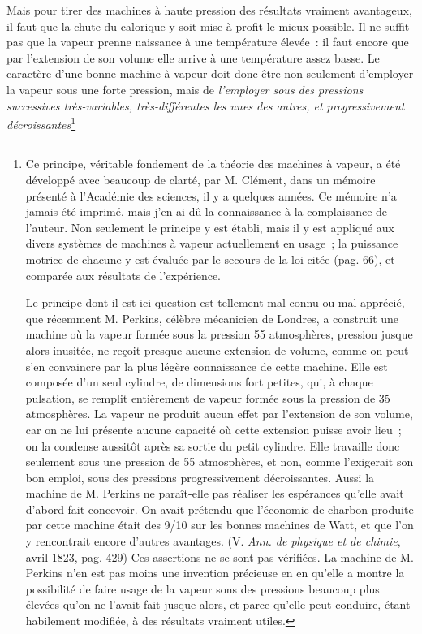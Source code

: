 \documentclass[french,twoside]{book} %
\begin{document}
Mais pour tirer des machines à haute pression des résultats vraiment avantageux, il faut que la chute du calorique y soit mise à profit le mieux possible. Il ne suffit pas que la vapeur prenne naissance à une température élevée : il faut encore que par l’extension de son volume elle arrive à une température assez basse. Le caractère d’une bonne machine à vapeur doit donc être non seulement d’employer la vapeur sous une forte pression, mais de \emph{l’employer sous des pressions successives très-variables, très-différentes les unes des autres, et progressivement décroissantes}\footnote{ \noindent Ce principe, véritable fondement de la théorie des machines à vapeur, a été développé avec beaucoup de clarté, par M. Clément, dans un mémoire présenté à l’Académie des sciences, il y a quelques années. Ce mémoire n’a jamais été imprimé, mais j’en ai dû la connaissance à la complaisance de l’auteur. Non seulement le principe y est établi, mais il y est appliqué aux divers systèmes de machines à vapeur actuellement en usage ; la puissance motrice de chacune y est évaluée par le secours de la loi citée (pag. 66), et comparée aux résultats de l’expérience.\par
 Le principe dont il est ici question est tellement mal connu ou mal apprécié, que récemment M. Perkins, célèbre mécanicien de Londres, a construit une machine où la vapeur formée sous la pression 55 atmosphères, pression jusque alors inusitée, ne reçoit presque aucune extension de volume, comme on peut s’en convaincre par la plus légère connaissance de cette machine. Elle est composée d’un seul cylindre, de dimensions fort petites, qui, à chaque pulsation, se remplit entièrement de vapeur formée sous la pression de 35 atmosphères. La vapeur ne produit aucun effet par l’extension de son volume, car on ne lui présente aucune capacité où cette extension puisse avoir lieu ; on la condense aussitôt après sa sortie du petit cylindre. Elle travaille donc seulement sous une pression de 55 atmosphères, et non, comme l’exigerait son bon emploi, sous des pressions progressivement décroissantes. Aussi la machine de M. Perkins ne paraît-elle pas réaliser les espérances qu’elle avait d’abord fait concevoir. On avait prétendu que l’économie de charbon produite par cette machine était des 9/10 sur les bonnes machines de Watt, et que l’on y rencontrait encore d’autres avantages. (V. \emph{Ann. de physique et de chimie}, avril 1823, pag. 429) Ces assertions ne se sont pas vérifiées. La machine de M. Perkins n’en est pas moins une invention précieuse en en qu’elle a montre la possibilité de faire usage de la vapeur sons des pressions beaucoup plus élevées qu’on ne l’avait fait jusque alors, et parce qu’elle peut conduire, étant habilement modifiée, à des résultats vraiment utiles.\par
}
\end{document}
